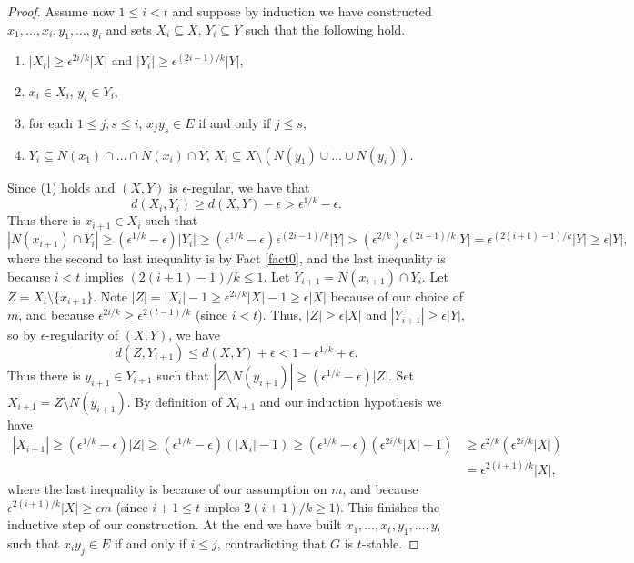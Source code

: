 \documentclass[11pt]{article}
\theoremstyle{definition}
\begin{document}
\begin{proof}
Assume now $1\leq i<t$ and suppose by induction we have constructed $x_1,\ldots, x_i,y_1,\ldots, y_{i}$ and sets $X_i\subseteq X$, $Y_i\subseteq Y$ such that the following hold.
\begin{enumerate}
\item  $|X_i|\geq \epsilon^{2i/k}|X|$ and $|Y_i|\geq \epsilon^{(2i-1)/k}|Y|$,
\item $x_i\in X_i$, $y_i\in Y_i$,
\item  for each $1\leq j, s\leq i$, $x_jy_s\in E$ if and only if $j\leq s$,
\item $Y_i\subseteq N(x_1)\cap \ldots \cap N(x_i)\cap Y$, $X_i\subseteq X\setminus (N(y_1)\cup \ldots \cup N(y_{i}))$.
\end{enumerate}
Since (1) holds and $(X,Y)$ is $\epsilon$-regular, we have that 
$$
d(X_i,Y_i)\geq d(X,Y)-\epsilon > \epsilon^{1/k} -\epsilon.
$$
Thus there is $x_{i+1}\in X_i$ such that 
$$
|N(x_{i+1})\cap Y_i|\geq (\epsilon^{1/k}-\epsilon)|Y_i|\geq (\epsilon^{1/k}-\epsilon)\epsilon^{(2i-1)/k}|Y|>(\epsilon^{2/k})\epsilon^{(2i-1)/k}|Y|=\epsilon^{(2(i+1)-1)/k}|Y|\geq \epsilon |Y|,
$$
where the second to last inequality is by Fact \ref{fact0}, and the last inequality is because $i<t$ implies $(2(i+1)-1)/k\leq 1$. Let $Y_{i+1}=N(x_{i+1})\cap Y_i$.  Let $Z=X_i\setminus \{x_{i+1}\}$.  Note $|Z|=|X_{i}|-1\geq \epsilon^{2i/k}|X|-1\geq \epsilon |X|$ because of our choice of $m$, and because $\epsilon^{2i/k}\geq \epsilon^{2(t-1)/k}$ (since $i<t$).  Thus, $|Z|\geq \epsilon |X|$ and $|Y_{i+1}|\geq \epsilon |Y|$, so by $\epsilon$-regularity of $(X,Y)$, we have
$$
d(Z,Y_{i+1})\leq d(X,Y)+\epsilon < 1-\epsilon^{1/k}+\epsilon.
$$
Thus there is $y_{i+1}\in Y_{i+1}$ such that $|Z\setminus N(y_{i+1})|\geq (\epsilon^{1/k}-\epsilon)|Z|$.  Set $X_{i+1}=Z\setminus N(y_{i+1})$.  By definition of $X_{i+1}$ and our induction hypothesis we have
\begin{align*}
|X_{i+1}|\geq (\epsilon^{1/k}-\epsilon)|Z|\geq (\epsilon^{1/k}-\epsilon)(|X_i|-1)\geq (\epsilon^{1/k}-\epsilon)(\epsilon^{2i/k}|X|-1)&\geq \epsilon^{2/k}(\epsilon^{2i/k}|X|)\\
&=\epsilon^{2(i+1)/k}|X|,
\end{align*}
where the last inequality is because of our assumption on $m$, and because $\epsilon^{2(i+1)/k}|X|\geq \epsilon m$ (since $i+1\leq t$ imples $2(i+1)/k\geq 1$).  This finishes the inductive step of our construction.  At the end we have built $x_1,\ldots, x_t, y_1,\ldots, y_t$ such that $x_iy_j\in E$ if and only if $i\leq j$, contradicting that $G$ is $t$-stable.  
\end{proof}
\end{document}
